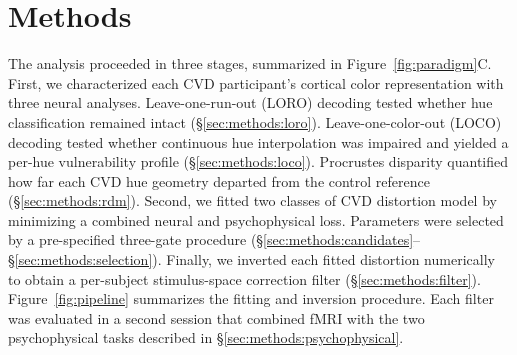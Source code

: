 
\section{Methods}
\label{sec:methods}

The analysis proceeded in three stages, summarized in Figure~\ref{fig:paradigm}C. First, we characterized each CVD participant's cortical color representation with three neural analyses. Leave-one-run-out (LORO) decoding tested whether hue classification remained intact (\S\ref{sec:methods:loro}). Leave-one-color-out (LOCO) decoding tested whether continuous hue interpolation was impaired and yielded a per-hue vulnerability profile (\S\ref{sec:methods:loco}). Procrustes disparity quantified how far each CVD hue geometry departed from the control reference (\S\ref{sec:methods:rdm}). Second, we fitted two classes of CVD distortion model by minimizing a combined neural and psychophysical loss. Parameters were selected by a pre-specified three-gate procedure (\S\ref{sec:methods:candidates}--\S\ref{sec:methods:selection}). Finally, we inverted each fitted distortion numerically to obtain a per-subject stimulus-space correction filter (\S\ref{sec:methods:filter}). Figure~\ref{fig:pipeline} summarizes the fitting and inversion procedure. Each filter was evaluated in a second session that combined fMRI with the two psychophysical tasks described in \S\ref{sec:methods:psychophysical}.

